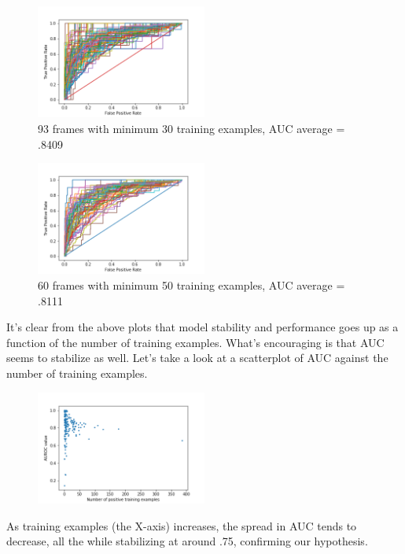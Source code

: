 \documentclass[11pt,a4paper]{article}
\begin{document}
\begin{figure}
	\centering
	\includegraphics[width=0.5\textwidth]{auc_plot30.png}
	\caption{\label{fig:frog} 93 frames with minimum 30 training examples, AUC average = .8409}
\end{figure}

\begin{figure}
	\centering
	\includegraphics[width=0.5\textwidth]{auc_plot50.png}
	\caption{\label{fig:frog} 60 frames with minimum 50 training examples, AUC average = .8111}
\end{figure}

It's clear from the above plots that model stability and performance goes up as a function of the number of training examples. What's encouraging is that AUC seems to stabilize as well. Let's take a look at a scatterplot of AUC against the number of training examples.

\begin{figure}
	\centering
	\includegraphics[width=0.5\textwidth]{auc_scatter5.png}
	\caption{\label{fig:frog} }
\end{figure}

As training examples (the X-axis) increases, the spread in AUC tends to decrease, all the while stabilizing at around .75, confirming our hypothesis.
\end{document}
